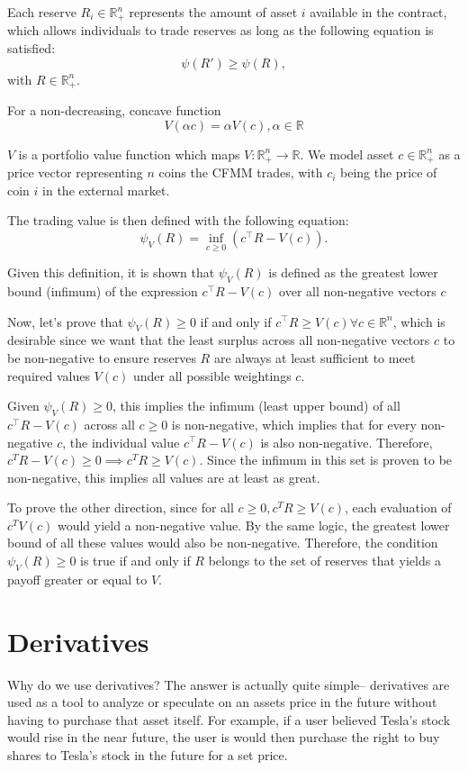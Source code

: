 \documentclass[12pt]{article}
\begin{document}
Each reserve \( R_i \in \mathbb{R}^n_+ \) represents the amount of asset \(i\) available in the contract, which allows individuals to trade reserves as long as the following equation is satisfied: 
\[ \psi(R') \geq \psi(R), 
    \] with \(R \in \mathbb{R}^n_+\).

    For a non-decreasing, concave function
    \[V(\alpha c) = \alpha V(c), \alpha\in\mathbb{R}
        \]
    
    \(V\) is a portfolio value function which maps \(V: \mathbb{R}^n_+ \to \mathbb{R}\). We model asset \(c \in \mathbb{R}^n_+\) as a price vector representing \(n\) coins the CFMM trades, with \(c_i\) being the price of coin \(i\) in the external market. 

    The trading value is then defined with the following equation:
    \[
        \psi_V\left(R\right) = \inf_{c\geq0}(c^{\intercal}R - V\left(c\right)).\]
    
    Given this definition, it is shown that \(\psi_V\left(R\right)\) is defined as the greatest lower bound (infimum) of the expression \(c^{\intercal}R - V\left(c\right) \) over all non-negative vectors \(c\)

    Now, let's prove that \(\psi_V\left(R\right) \geq 0\) if and only if \(c^{\intercal}R \geq V(c) \forall c \in \mathbb{R}^n\), which is desirable since we want that the least surplus across all non-negative vectors \(c\) to be non-negative to ensure reserves \(R\) are always at least sufficient to meet required values \(V(c)\) under all possible weightings \(c\).

    Given \(\psi_V\left(R\right) \geq 0\), this implies the infimum (least upper bound) of all \(c^{\intercal}R - V\left(c\right)\) across all \(c \geq 0\) is non-negative, which implies that for every non-negative \(c\), the individual value \(c^{\intercal}R - V\left(c\right)\) is also non-negative. Therefore, \(c^TR-V(c) \geq 0 \implies c^TR \geq V(c)\). Since the infimum in this set is proven to be non-negative, this implies all values are at least as great.

    To prove the other direction, since for all \(c \geq 0, c^TR \geq V(c)\), each evaluation of \(c^TV(c)\) would yield a non-negative value. By the same logic, the greatest lower bound of all these values would also be non-negative. Therefore, the condition \(\psi_V\left(R\right) \geq 0\) is true if and only if \(R\) belongs to the set of reserves that yields a payoff greater or equal to \(V\).


\section{Derivatives}
Why do we use derivatives? The answer is actually quite simple-- derivatives are used as a tool to analyze or speculate on an assets price in the future without having to purchase that asset itself. For example, if a user believed Tesla's stock would rise in the near future, the user is would then purchase the right to buy shares to Tesla's stock in the future for a set price.
\end{document}
